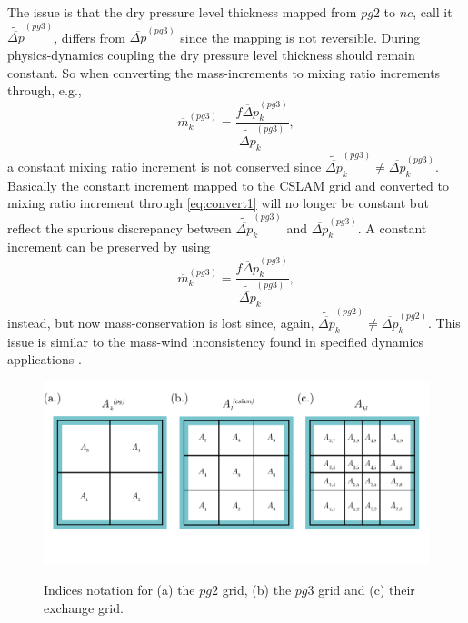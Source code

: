 The issue is that the dry pressure level thickness mapped from $pg2$ to $nc$, call it $\widetilde{\overline{\Delta p}}^{(pg3)}$, differs from $\overline{\Delta p}^{(pg3)}$ since the mapping is not reversible. During physics-dynamics coupling the dry pressure level thickness should remain constant. So when converting the mass-increments to mixing ratio increments through, e.g.,
\begin{equation}
\label{eq:convert1}
\overline{m}^{(pg3)}_k=\frac{\overline{f\Delta p}^{(pg3)}_k}{{\widetilde{\overline{\Delta p}}}^{(pg3)}_k},
\end{equation}
a constant mixing ratio increment is not conserved since $\widetilde{\overline{\Delta p}}^{(pg3)}_k\ne {\overline{\Delta p}}^{(pg3)}_k$. Basically the constant increment mapped to the CSLAM grid and converted to mixing ratio increment through \eqref{eq:convert1} will no longer be constant but reflect the spurious discrepancy between $\widetilde{\overline{\Delta p}}^{(pg3)}_k$ and ${\overline{\Delta p}}^{(pg3)}_k$. A constant increment can be preserved by using
\begin{equation}
\overline{m}^{(pg3)}_k=\frac{\overline{f\Delta p}^{(pg3)}_k}{\widetilde{\overline{\Delta p}}^{(pg3)}_k},
\end{equation}
instead, but now mass-conservation is lost since, again, $\widetilde{\overline{\Delta p}}^{(pg2)}_k\ne {\overline{\Delta p}}^{(pg2)}_k$. This issue is similar to the mass-wind inconsistency found in specified dynamics applications \citep[e.g.][]{JKLSBCRE2001QJR,L2009LNCE}. 

\begin{figure}[t]
\begin{center}
\noindent\includegraphics[width=30pc,angle=0]{figs/area-schematic.png}\\
\end{center}
\caption{Indices notation for (a) the $pg2$ grid, (b) the $pg3$ grid and (c) their exchange grid. {\color{red}{[change superscript in (a) to pg2. superscript in (b) to pg3]}}}
\label{fig:area-schematic}
\end{figure}

